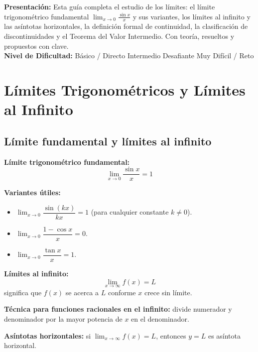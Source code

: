 \documentclass[12pt, letterpaper]{article}
\begin{document}

\vspace{4pt}
\begin{cuadroinfo}
  \small
  \textbf{Presentación:} Esta guía completa el estudio de los límites: el límite trigonométrico fundamental $\lim_{x \to 0} \frac{\sin x}{x}$ y sus variantes, los límites al infinito y las asíntotas horizontales, la definición formal de continuidad, la clasificación de discontinuidades y el Teorema del Valor Intermedio. Con teoría, resueltos y propuestos con clave.
  \\[4pt]
  \textbf{Nivel de Dificultad:}\quad
  \facil{} Básico / Directo \quad
  \medio{} Intermedio \quad
  \dificil{} Desafiante \quad
  \muyDificil{} Muy Difícil / Reto
\end{cuadroinfo}

\vspace{8pt}

\section{Límites Trigonométricos y Límites al Infinito}

\subsection{Límite fundamental y límites al infinito}

\begin{cuadroteoria}
  \textbf{Límite trigonométrico fundamental:}
  $$\boxed{\lim_{x \to 0} \frac{\sin x}{x} = 1}$$

  \textbf{Variantes útiles:}
  \begin{itemize}[leftmargin=*]
    \item $\lim_{x \to 0} \dfrac{\sin(kx)}{kx} = 1$ (para cualquier constante $k \neq 0$).
    \item $\lim_{x \to 0} \dfrac{1 - \cos x}{x} = 0$.
    \item $\lim_{x \to 0} \dfrac{\tan x}{x} = 1$.
  \end{itemize}
\end{cuadroteoria}

\begin{cuadrosolucion}
  \textbf{Límites al infinito:}
  $$\lim_{x \to \infty} f(x) = L$$
  significa que $f(x)$ se acerca a $L$ conforme $x$ crece sin límite.

  \textbf{Técnica para funciones racionales en el infinito:} divide numerador y denominador por la mayor potencia de $x$ en el denominador.

  \textbf{Asíntotas horizontales:} si $\lim_{x \to \infty} f(x) = L$, entonces $y = L$ es asíntota horizontal.
\end{cuadrosolucion}
\end{document}
